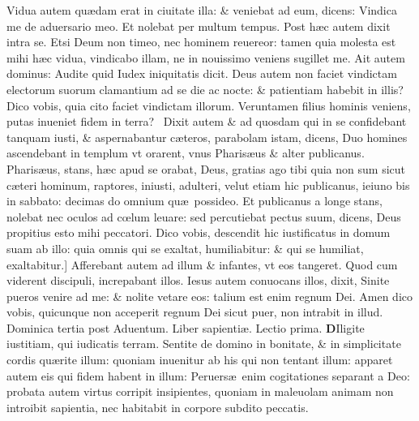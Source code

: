 \documentclass[a5paper,10pt]{book}
\def\leftmarginnote{%
	\lrmarginnote{\hskip -\marginparsep \hskip -6.5em}}
\def\rightmarginnote{%
	\lrmarginnote{\hskip\columnwidth \hskip -1em}}
\def\ae{æ}
\def\oe{œ}
\begin{document}
\begin{multicols*}{2}
Vidua autem qu\ae dam erat in ciuitate illa: \& veniebat ad eum, dicens: Vindica me de aduersario meo.
Et nolebat per multum tempus. Post h\ae c autem dixit intra se. Etsi Deum non timeo, nec hominem reuereor: tamen quia molesta est mihi h\ae c vidua, vindicabo illam, ne in nouissimo veniens sugillet me.
Ait autem dominus: Audite quid Iudex iniquitatis dicit. Deus autem non faciet vindictam electorum suorum clamantium ad se die ac nocte: \& patientiam habebit in illis?
Dico vobis, quia cito faciet vindictam illorum. Veruntamen filius hominis veniens, putas inueniet fidem in terra? \textdagger \ 
Dixit\leftmarginnote{\begin{flushright}B\end{flushright}} autem \& ad quosdam qui in se confidebant tanquam iusti, \& aspernabantur c\ae teros, parabolam istam, dicens, Duo homines ascendebant in templum vt orarent, vnus Pharis\ae us \& alter publicanus.
Pharis\ae us, stans, h\ae c apud se orabat, Deus, gratias ago tibi quia non sum sicut c\ae teri hominum, raptores, iniusti, adulteri, velut etiam hic publicanus, ieiuno bis in sabbato: decimas do omnium qu\ae \ possideo.
Et publicanus a longe stans, nolebat nec oculos ad c\oe lum leuare: sed percutiebat pectus suum, dicens, Deus propitius esto mihi peccatori.
Dico vobis, descendit hic iustificatus in domum suam ab illo: quia omnis qui se exaltat, humiliabitur: \& qui se\rightmarginnote{C} humiliat, exaltabitur.]
Afferebant autem ad illum \& infantes, vt eos tangeret. Quod cum viderent discipuli, increpabant illos.
Iesus autem conuocans illos, dixit, Sinite pueros venire ad me: \& nolite vetare eos: talium est enim regnum Dei.
Amen dico vobis, quicunque non acceperit regnum Dei sicut puer, non intrabit in illud.
\newline \textswab{C} \color{red} \hypertarget{SUN-TERTIA-POST-ADV}{Dominica tertia} post Aduentum. \color{black}
\bookmark[rellevel=-1,dest=SUN-TERTIA-POST-ADV]{DOMINICA III POST ADVENTVM}
\newline \color{red} Liber sapienti\ae . \hfill Lectio prima. \color{black}
\vspace{-1.25em}
\lettrine[lines=2]{\bfseries D}{}Iligite\rightmarginnote{ca. 1.} iustitiam, qui iudicatis terram.
Sentite de domino in bonitate, \& in simplicitate cordis qu\ae rite illum: quoniam inuenitur ab his qui non tentant illum: apparet autem eis qui fidem habent
in illum: Peruers\ae \ enim cogitationes separant a Deo: probata autem virtus corripit insipientes, quoniam in maleuolam animam non introibit sapientia, nec habitabit in corpore subdito peccatis.

\end{multicols*}
\end{document}
